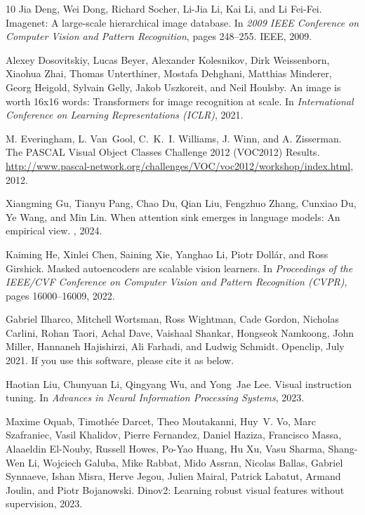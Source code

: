 \documentclass[10pt,twocolumn,letterpaper]{article}
\begin{document}
{\begin{thebibliography}{10}
Jia Deng, Wei Dong, Richard Socher, Li-Jia Li, Kai Li, and Li Fei-Fei.
\newblock Imagenet: A large-scale hierarchical image database.
\newblock In {\em 2009 IEEE Conference on Computer Vision and Pattern Recognition}, pages 248--255. IEEE, 2009.

Alexey Dosovitskiy, Lucas Beyer, Alexander Kolesnikov, Dirk Weissenborn, Xiaohua Zhai, Thomas Unterthiner, Mostafa Dehghani, Matthias Minderer, Georg Heigold, Sylvain Gelly, Jakob Uszkoreit, and Neil Houlsby.
\newblock An image is worth 16x16 words: Transformers for image recognition at scale.
\newblock In {\em International Conference on Learning Representations (ICLR)}, 2021.

M. Everingham, L. Van~Gool, C.~K.~I. Williams, J. Winn, and A. Zisserman.
\newblock The {PASCAL} {V}isual {O}bject {C}lasses {C}hallenge 2012 {(VOC2012)} {R}esults.
\newblock \url{http://www.pascal-network.org/challenges/VOC/voc2012/workshop/index.html}, 2012.

Xiangming Gu, Tianyu Pang, Chao Du, Qian Liu, Fengzhuo Zhang, Cunxiao Du, Ye Wang, and Min Lin.
\newblock When attention sink emerges in language models: An empirical view.
, 2024.

Kaiming He, Xinlei Chen, Saining Xie, Yanghao Li, Piotr Doll{\'a}r, and Ross Girshick.
\newblock Masked autoencoders are scalable vision learners.
\newblock In {\em Proceedings of the IEEE/CVF Conference on Computer Vision and Pattern Recognition (CVPR)}, pages 16000--16009, 2022.

Gabriel Ilharco, Mitchell Wortsman, Ross Wightman, Cade Gordon, Nicholas Carlini, Rohan Taori, Achal Dave, Vaishaal Shankar, Hongseok Namkoong, John Miller, Hannaneh Hajishirzi, Ali Farhadi, and Ludwig Schmidt.
\newblock Openclip, July 2021.
\newblock If you use this software, please cite it as below.

Haotian Liu, Chunyuan Li, Qingyang Wu, and Yong~Jae Lee.
\newblock Visual instruction tuning.
\newblock In {\em Advances in Neural Information Processing Systems}, 2023.

Maxime Oquab, Timothée Darcet, Theo Moutakanni, Huy~V. Vo, Marc Szafraniec, Vasil Khalidov, Pierre Fernandez, Daniel Haziza, Francisco Massa, Alaaeldin El-Nouby, Russell Howes, Po-Yao Huang, Hu Xu, Vasu Sharma, Shang-Wen Li, Wojciech Galuba, Mike Rabbat, Mido Assran, Nicolas Ballas, Gabriel Synnaeve, Ishan Misra, Herve Jegou, Julien Mairal, Patrick Labatut, Armand Joulin, and Piotr Bojanowski.
\newblock Dinov2: Learning robust visual features without supervision, 2023.


\end{thebibliography}}
\end{document}
